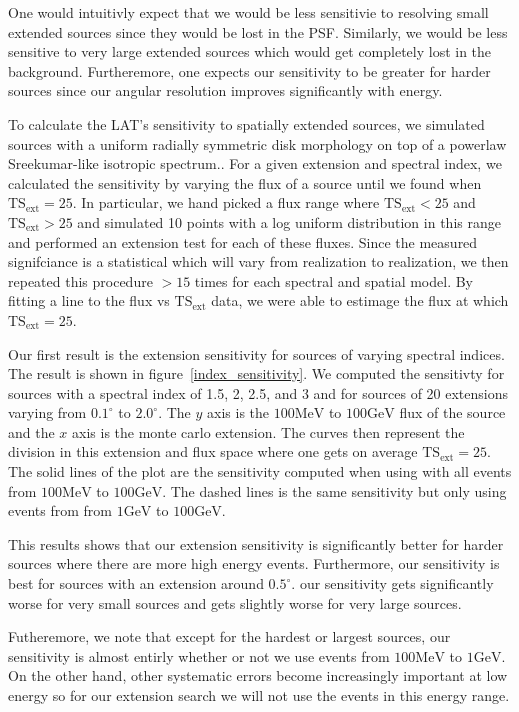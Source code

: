 \documentclass[preprint]{aastex}
\newcommand{\mev}{\text{MeV}\xspace}
\newcommand{\gev}{\text{GeV}\xspace}
\newcommand{\tsext}{\ensuremath{\text{TS}_\text{ext}}\xspace}
\begin{document}
One would intuitivly expect that we would be less sensitivie to resolving
small extended sources since they would be lost in the PSF.  Similarly,
we would be less sensitive to very large extended sources which would
get completely lost in the background. Furtheremore, one expects our
sensitivity to be greater for harder sources since our angular resolution
improves significantly with energy.

To calculate the LAT's sensitivity to spatially extended sources,
we simulated sources with a uniform radially symmetric
disk morphology on top of a powerlaw
Sreekumar-like isotropic spectrum.\cite{Sreekumar et al. ApJ 494 pag
523 1998}.  For a given extension and spectral index, we calculated the
sensitivity by varying the flux of a source until we found 
when $\tsext=25$. In particular, we hand picked a flux range
where $\tsext<25$ and $\tsext>25$ and simulated 10 points with
a log uniform distribution in this range and performed an extension
test for each of these fluxes. Since the measured signifciance is
a statistical which will vary from realization to realization,
we then repeated this procedure $>15$ times for each spectral
and spatial model.
By fitting a line to the flux vs $\tsext$ data, we were able to
estimage the flux at which $\tsext=25$.

Our first result is the extension sensitivity for sources of varying
spectral indices. The result is shown in figure~\ref{index_sensitivity}.
We computed the sensitivty for sources with a spectral index of 1.5,
2, 2.5, and 3 and for sources of 20 extensions varying from $0.1^\circ$
to $2.0^\circ$. The $y$ axis is the $100\mev$ to $100\gev$ flux of the
source and the $x$ axis is the monte carlo extension. The curves then
represent the division in this extension and flux space where one gets
on average $\tsext=25$.
The solid lines of the plot are the sensitivity computed when using
with all events from $100\mev$ to $100\gev$. The dashed lines is the
same sensitivity but only using events from from $1\gev$ to $100\gev$.

This results shows that our extension sensitivity is
significantly better for harder sources where there are more high
energy events. Furthermore, our sensitivity is best for sources with an
extension around $0.5^\circ$.  our sensitivity gets significantly worse
for very small sources and gets slightly worse for very large sources.

Futheremore, we note that except for the hardest or largest sources,
our sensitivity is almost entirly whether or not we use events from
$100\mev$ to $1\gev$. On the other hand, other systematic errors become
increasingly important at low energy so for our extension search we will
not use the events in this energy range.
\end{document}
